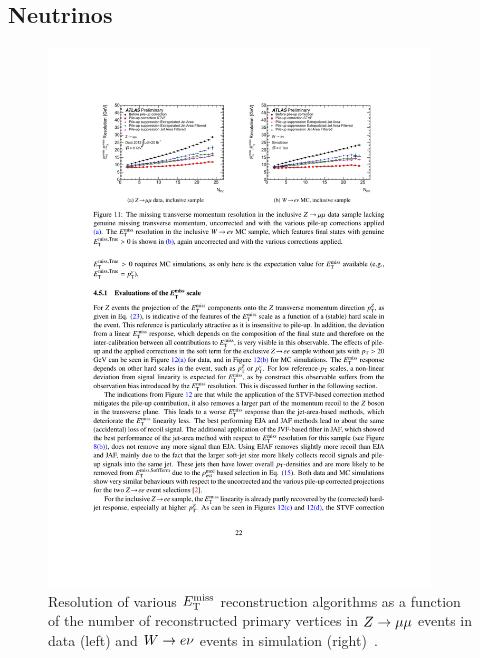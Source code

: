\subsection{Neutrinos}

\begin{figure}[tp]
  \centering
  \includegraphics[width=0.90\textwidth]{figures/performance/met-resolutionvsnpv}
  \caption{Resolution of various $E_{\mathrm{T}}^{\mathrm{miss}}$ reconstruction algorithms as a function of the number of reconstructed primary vertices in $Z \rightarrow \mu\mu$ events in data (left) and $W \rightarrow e\nu$ events in simulation (right)~\cite{ATLAS-CONF-2014-019}.}
  \label{fig:objects-met-resolution}
\end{figure}
